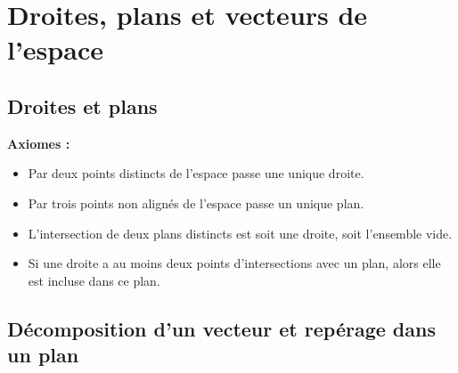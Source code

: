 \documentclass[10pt]{article}
\begin{document}
\maketitle

\section{Droites, plans et vecteurs de l'espace}

\subsection{Droites et plans}

\textbf{Axiomes :}
\begin{itemize}
    \item Par deux points distincts de l'espace passe une unique droite.
    \item Par trois points non alignés de l'espace passe un unique plan.
    \item L'intersection de deux plans distincts est soit une droite, soit l'ensemble vide.
    \item Si une droite a au moins deux points d'intersections avec un plan, alors elle est incluse dans ce plan.
\end{itemize}



\subsection{Décomposition d'un vecteur et repérage dans un plan}
\end{document}
